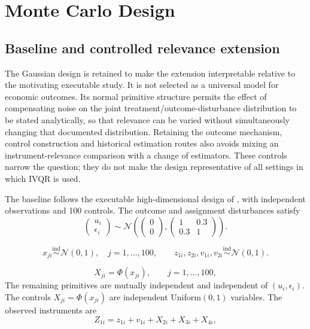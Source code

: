 \section{Monte Carlo Design}
\label{chap:monte-carlo-design}
\subsection{Baseline and controlled relevance extension}
\label{sec:monte-carlo-design}
The Gaussian design is retained to make the extension interpretable relative to the motivating executable study. It is not selected as a universal model for economic outcomes. Its normal primitive structure permits the effect of compensating noise on the joint treatment/outcome-disturbance distribution to be stated analytically, so that relevance can be varied without simultaneously changing that documented distribution. Retaining the outcome mechanism, control construction and historical estimation routes also avoids mixing an instrument-relevance comparison with a change of estimators. These controls narrow the question; they do not make the design representative of all settings in which IVQR is used.

The baseline follows the executable high-dimensional design of \textcite{chen_huang_tien_2021}, with independent observations and 100 controls. The outcome and assignment disturbances satisfy
\begin{equation}
  \begin{pmatrix}
    u_i \\
    \epsilon_i
  \end{pmatrix}
  \sim
  \mathcal{N}\!\left(
    \begin{pmatrix} 0 \\ 0 \end{pmatrix},
    \begin{pmatrix} 1 & 0.3 \\ 0.3 & 1 \end{pmatrix}
  \right).
  \label{eq:dgp-disturbances}
\end{equation}

\begin{equation}
  x_{ji}\overset{\mathrm{ind}}{\sim}\mathcal{N}(0,1),
  \quad j=1,\ldots,100,
  \qquad
  z_{1i},z_{2i},v_{1i},v_{2i}
  \overset{\mathrm{ind}}{\sim}\mathcal{N}(0,1).
  \label{eq:dgp-primitives}
\end{equation}

\begin{equation}
  X_{ji}=\Phi(x_{ji}),
  \qquad j=1,\ldots,100,
  \label{eq:dgp-controls}
\end{equation}
The remaining primitives are mutually independent and independent of $(u_i,\epsilon_i)$. The controls $X_{ji}=\Phi(x_{ji})$ are independent Uniform$(0,1)$ variables. The observed instruments are
\begin{equation}
  Z_{1i}=z_{1i}+v_{1i}+X_{2i}+X_{3i}+X_{4i},
  \label{eq:dgp-instrument1}
\end{equation}

